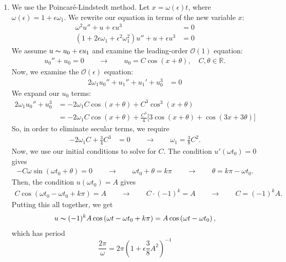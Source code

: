 \documentclass[10pt,letterpaper]{report}
\newcommand{\R}{\mathbb{R}}
\newcommand{\so}{\qquad \rightarrow \qquad}
\newcommand{\Ord}[1]{\mathcal{O}\left({#1}\right)}
\begin{document}
\begin{enumerate}
\begin{enumerate}
    \item We use the Poincar\'e-Lindstedt method. Let $x = \omega(\epsilon) t$, where $\omega(\epsilon) = 1 + \epsilon\omega_1$. We rewrite our equation in terms of the new variable $x:$
    \begin{align*}
        \omega^2 u'' + u + \epsilon u^3 &= 0 \\
        \left(1 + 2\epsilon\omega_1 + \epsilon^2\omega_1^2\right)u'' + u + \epsilon u^3 &= 0
    \end{align*}
    We assume $u \thicksim u_0 + \epsilon u_1$ and examine the leading-order $\Ord{1}$ equation:
    \begin{align*}
        u_0'' + u_0 = 0 \so u_0 = C\cos(x + \theta), \quad C, \theta \in \R.
    \end{align*}
    Now, we examine the $\Ord{\epsilon}$ equation:
    \begin{align*}
        2\omega_1 u_0'' + u_1'' + u_1' + u_0^3 &= 0
    \end{align*}
    We expand our $u_0$ terms:
    \begin{align*}
        2\omega_1 u_0'' + u_0^3
        &=
        -2\omega_1C\cos(x + \theta) + C^3\cos^3(x + \theta)
        \\
        &=
        -2\omega_1C\cos(x + \theta) + \frac{C^3}{4}\big[3\cos(x + \theta) + \cos(3x + 3\theta)\big]
    \end{align*}
    So, in order to eliminate secular terms, we require
    \begin{align*}
        -2\omega_1 C + \frac{3}{4}C^3 &= 0 \so
        \omega_1 = \frac{3}{8}C^2.
    \end{align*}
    Now, we use our initial conditions to solve for $C$. The condition $u'(\omega t_0) = 0$ gives
    \begin{align*}
        -C\omega\sin(\omega t_0 + \theta) = 0 \so \omega t_0 + \theta = k\pi \so \theta = k\pi - \omega t_0.
    \end{align*}
    Then, the condition $u(\omega t_0) = A$ gives
    \begin{align*}
        C \cos(\omega t_0 - \omega t_0 + k\pi) = A \so C\cdot (-1)^k = A \so C = (-1)^k A.
    \end{align*}
    Putting this all together, we get
    \begin{align*}
        u \thicksim (-1)^k A \cos\left(\omega t - \omega t_0 + k\pi \right) = A \cos\left(\omega t - \omega t_0 \right),
    \end{align*}
    which has period 
    \[
    \frac{2\pi}{\omega} = 2\pi \left(1 + \epsilon\frac{3}{8}A^2\right)^{-1}
    \]
\end{enumerate}


\end{enumerate}
\end{document}
